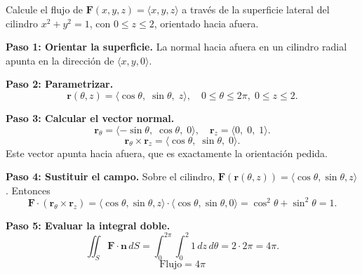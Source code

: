 \begin{example}
Calcule el flujo de $\mathbf{F}(x,y,z)=\langle x,y,z\rangle$ a través de la superficie lateral del cilindro $x^2+y^2=1$, con $0\le z\le 2$, orientado hacia afuera.
\begin{myproof}
\textbf{Paso 1: Orientar la superficie.}
La normal hacia afuera en un cilindro radial apunta en la dirección de $\langle x,y,0\rangle$.

\textbf{Paso 2: Parametrizar.}
\[
\mathbf{r}(\theta,z)=\langle \cos\theta,\; \sin\theta,\; z \rangle,
\quad 0\le\theta\le 2\pi,\; 0\le z\le 2.
\]

\textbf{Paso 3: Calcular el vector normal.}
\[
\mathbf{r}_\theta = \langle -\sin\theta,\; \cos\theta,\; 0 \rangle,\quad
\mathbf{r}_z = \langle 0,\; 0,\; 1 \rangle.
\]
\[
\mathbf{r}_\theta \times \mathbf{r}_z
= \langle \cos\theta,\; \sin\theta,\; 0 \rangle.
\]
Este vector apunta hacia afuera, que es exactamente la orientación pedida.

\textbf{Paso 4: Sustituir el campo.}
Sobre el cilindro, $\mathbf{F}(\mathbf{r}(\theta,z)) = \langle \cos\theta, \sin\theta, z\rangle$. Entonces
\[
\mathbf{F}\cdot(\mathbf{r}_\theta \times \mathbf{r}_z)
= \langle \cos\theta,\sin\theta,z\rangle \cdot \langle \cos\theta,\sin\theta,0\rangle
= \cos^2\theta+\sin^2\theta = 1.
\]

\textbf{Paso 5: Evaluar la integral doble.}
\[
\iint_S \mathbf{F}\cdot\mathbf{n}\,dS
= \int_0^{2\pi}\int_0^2 1\,dz\,d\theta = 2\cdot 2\pi = 4\pi.
\]
\[
\boxed{\text{Flujo} = 4\pi}
\]
\end{myproof}
\end{example}

